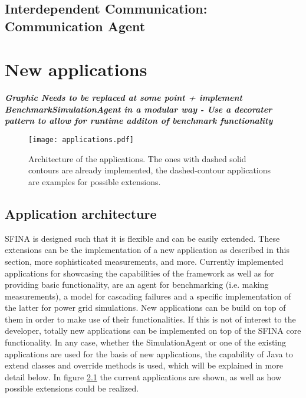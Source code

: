 \documentclass[11pt,fleqn]{book} %
\newcommand{\CommunicationAgent}{Communication Agent }
\begin{document}
\section{Interdependent Communication: \CommunicationAgent }




\chapter{New applications}
\label{ch:new_applications}

\textit{\textbf{Graphic Needs to be replaced at some point + implement BenchmarkSimulationAgent in a modular way - Use a decorater pattern to allow for runtime additon of benchmark functionality}}

\begin{figure}[!ht]
\centering\texttt{[image: applications.pdf]}
\caption{Architecture of the applications. The ones with dashed solid contours are already implemented, the dashed-contour applications are examples for possible extensions.}
\label{fig:apps}
\end{figure}

\section{Application architecture}\label{sec:apps}
SFINA is designed such that it is flexible and can be easily extended. These extensions can be the implementation of a new application as described in this section, more sophisticated measurements, and more. Currently implemented applications for showcasing the capabilities of the framework as well as for providing basic functionality, are an agent for benchmarking (i.e. making measurements), a model for cascading failures and a specific implementation of the latter for power grid simulations. New applications can be build on top of them in order to make use of their functionalities. If this is not of interest to the developer, totally new applications can be implemented on top of the SFINA core functionality. In any case, whether the SimulationAgent or one of the existing applications are used for the basis of new applications, the capability of Java to extend classes and override methods is used, which will be explained in more detail below. In figure \ref{fig:apps} the current applications are shown, as well as how possible extensions could be realized.
\end{document}
